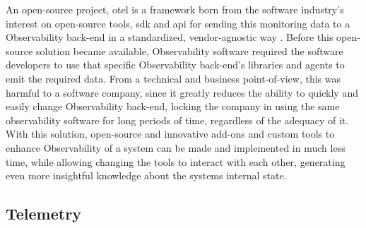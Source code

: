 An open-source project, \gls{otel} is a framework born from the software industry's interest on open-source tools, \gls{sdk} and \gls{api} for sending this monitoring data to a Observability back-end in a standardized, vendor-agnostic way \Parencite{observability_primer_2022}. Before this open-source solution became available, Observability software required the software developers to use that specific Observability back-end's libraries and agents to emit the required data. From a technical and business point-of-view, this was harmful to a software company, since it greatly reduces the ability to quickly and easily change Observability back-end, locking the company in using the same observability software for long periods of time, regardless of the adequacy of it.
With this solution, open-source and innovative add-ons and custom tools to enhance Observability of a system can be made and implemented in much less time, while allowing changing the tools to interact with each other, generating even more insightful knowledge about the systems internal state.

\subsection{Telemetry}\label{state-of-the-art:ss:telemetry}

